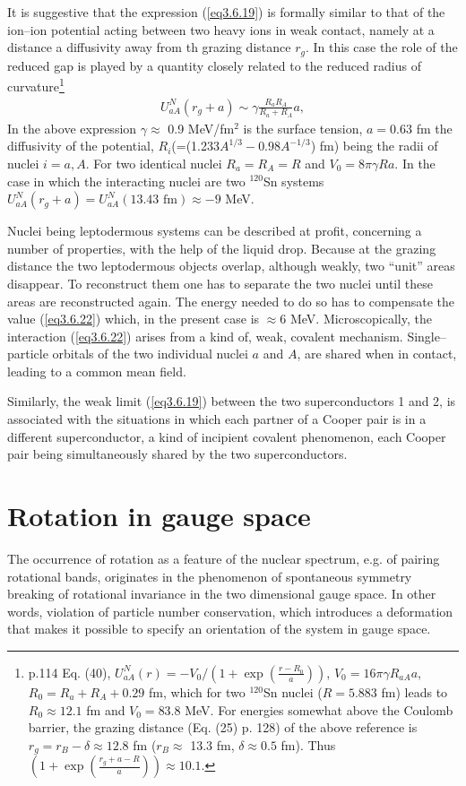  
 It is suggestive that the expression (\ref{eq3.6.19}) is formally similar to that of the ion--ion potential acting between two heavy ions in weak contact, namely at a distance  a diffusivity away from th grazing distance $r_g$. In this case the role of the reduced gap is played by a quantity closely related to the reduced radius of curvature\footnote{\cite{Broglia:04a} p.114  Eq. (40), $U_{aA}^{N}(r)=-V_0/(1+\exp(\frac{r-R_0}{a}))$, $V_0=16\pi\gamma R_{aA}a$, $R_0=R_a+R_A+0.29$ fm, which for two $^{120}$Sn nuclei ($R=5.883$ fm) leads to $R_0\approx12.1$ fm and $V_0=83.8$ MeV. For energies somewhat above the Coulomb barrier, the grazing distance (Eq. (25) p. 128) of the above reference is $r_g=r_B-\delta\approx12.8$ fm ($r_B\approx$ 13.3 fm, $\delta\approx0.5$ fm). Thus $(1+\exp(\frac{r_g+a-R}{a}))\approx10.1$.}
 \begin{align}\label{eq3.6.22}
 U_{aA}^N(r_g+a)\sim \gamma\frac{R_aR_A}{R_a+R_A}a,
 \end{align}
 In the above expression $\gamma\approx$ 0.9 MeV/fm$^2$ is the surface tension, $a=0.63$ fm the diffusivity of the potential, $R_i$(=(1.233$A^{1/3}-0.98A^{-1/3}$) fm) being the radii of nuclei $i=a,A$. For two identical nuclei $R_a=R_A=R$ and $V_0=8\pi\gamma R a$. In the case in which the interacting nuclei are two  $^{120}$Sn systems  $U_{aA}^N(r_g+a)=U_{aA}^N(13.43 \text{ fm})\approx-9$ MeV.
 
 
 
  Nuclei being leptodermous systems can be described at profit, concerning a number of properties, with the help of the liquid drop. Because at the grazing distance the two leptodermous objects overlap, although weakly, two ``unit'' areas disappear. To reconstruct them one has to separate the two nuclei until these areas are reconstructed again. The energy needed to do so has to compensate the value (\ref{eq3.6.22}) which, in the present case  is $\approx$6 MeV. Microscopically, the interaction (\ref{eq3.6.22}) arises from a kind of, weak, covalent mechanism. Single--particle orbitals of the two individual nuclei $a$ and $A$, are shared when in contact, leading to a common mean field.
 
 
 Similarly, the weak limit (\ref{eq3.6.19}) between the two superconductors 1 and 2, is associated with the situations in which each partner of a Cooper pair is in a different superconductor, a kind of incipient covalent phenomenon, each Cooper pair being simultaneously shared by the two superconductors.  
\section{Rotation in gauge space}\label{S3.7}
The occurrence of rotation as a feature of the nuclear spectrum, e.g. of pairing rotational bands, originates in the phenomenon of spontaneous symmetry breaking of rotational invariance in the two dimensional gauge space. In other words, violation of particle number conservation, which introduces a deformation that makes it possible to specify an orientation of the system in gauge space.



